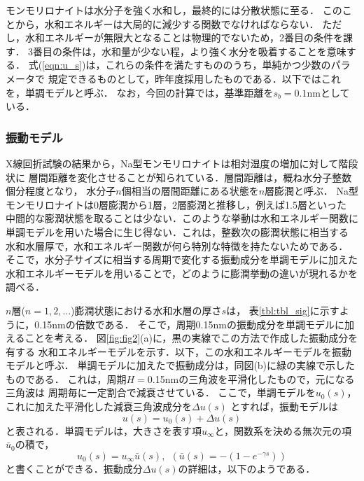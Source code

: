 モンモリロナイトは水分子を強く水和し，最終的には分散状態に至る．
このことから，水和エネルギーは大局的に減少する関数でなければならない．
ただし，水和エネルギーが無限大となることは物理的でないため，2番目の条件を課す．
3番目の条件は，水和量が少ない程，より強く水分を吸着することを意味する．
式(\ref{eqn:u_s})は，これらの条件を満たすもののうち，単純かつ少数のパラメータで
規定できるものとして，昨年度採用したものである．以下ではこれを，単調モデルと呼ぶ．
なお，今回の計算では，基準距離を$s_b=0.1$nmとしている．
%
\subsubsection{振動モデル}
X線回折試験の結果から，Na型モンモリロナイトは相対湿度の増加に対して階段状に
層間距離を変化させることが知られている．層間距離は，概ね水分子整数個分程度となり，
水分子$n$個相当の層間距離にある状態を$n$層膨潤と呼ぶ．
Na型モンモリロナイトは0層膨潤から1層，2層膨潤と推移し，例えば1.5層といった
中間的な膨潤状態を取ることは少ない．このような挙動は水和エネルギー関数に
単調モデルを用いた場合に生じ得ない．これは，整数次の膨潤状態に相当する
水和水層厚で，水和エネルギー関数が何ら特別な特徴を持たないためである．
そこで，水分子サイズに相当する周期で変化する振動成分を単調モデルに加えた
水和エネルギーモデルを用いることで，どのように膨潤挙動の違いが現れるかを調べる．

$n$層($n=1,2,\dots$)膨潤状態における水和水層の厚さ$s$は，
表\ref{tbl:tbl_sig}に示すように，0.15nmの倍数である．
そこで，周期0.15nmの振動成分を単調モデルに加えることを考える．
図\ref{fig:fig2}(a)に，黒の実線でこの方法で作成した振動成分を有する
水和エネルギーモデルを示す．以下，この水和エネルギーモデルを振動モデルと呼ぶ．
単調モデルに加えたで振動成分は，同図(b)に緑の実線で示したものである．
これは，周期$H=$0.15nmの三角波を平滑化したもので，元になる三角波は
周期毎に一定割合で減衰させている．
ここで，単調モデルを$u_0(s)$，これに加えた平滑化した減衰三角波成分を$\Delta u(s)$
とすれば，振動モデルは
\begin{equation}
	u(s)=u_0(s)+ \Delta u(s)
	\label{eqn:}
\end{equation}
と表される．単調モデルは，大きさを表す項$u_{\infty}$と，関数系を決める無次元の項
$\bar u_0$の積で，
\begin{equation}
	u_0(s)=u_{\infty} \bar{u}(s), \ \ (\bar{u}(s)=-(1-e^{-\gamma s}))
	\label{eqn:}
\end{equation}
と書くことができる．振動成分$\Delta u(s)$の詳細は，以下のようである．


